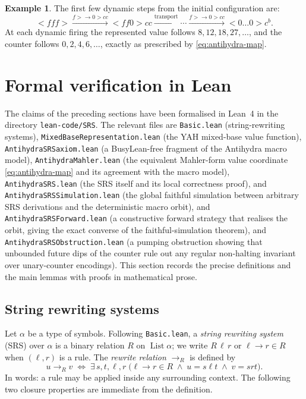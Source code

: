 \documentclass[11pt,a4paper]{article}
\theoremstyle{definition}
\newtheorem{example}[definition]{Example}
\newcommand{\lt}{<}
\newcommand{\gt}{>}
\newcommand{\List}{\operatorname{List}}
\begin{document}
\begin{example}
  The first few dynamic steps from the initial configuration are:
  \[
    \lt fff\gt
    \xrightarrow{f\gt\to0\gt cc}
    \lt ff0\gt cc
    \xrightarrow{\text{transport}}
    \cdots
    \xrightarrow{f\gt\to0\gt cc}
    \lt 0\dots0\gt c^{b}.
  \]
  At each dynamic firing the represented value follows
  $8,12,18,27,\dots$, and the counter follows $0,2,4,6,\dots$,
  exactly as prescribed by \eqref{eq:antihydra-map}.
\end{example}

\section{Formal verification in Lean}
\label{sec:lean}

\begin{sloppypar}
The claims of the preceding sections have been formalised in Lean~4 in
the directory \texttt{lean-code/SRS}.  The relevant files are
\texttt{Basic.lean} (string-rewriting systems),
\texttt{MixedBaseRepresentation.lean} (the YAH mixed-base value
function), \texttt{AntihydraSRSaxiom.lean} (a BusyLean-free fragment of
the Antihydra macro model), \texttt{AntihydraMahler.lean} (the equivalent
Mahler-form value coordinate \eqref{eq:antihydra-map} and its agreement
with the macro model), \texttt{AntihydraSRS.lean} (the SRS itself
and its local correctness proof), and
\texttt{AntihydraSRSSimulation.lean} (the global faithful simulation
between arbitrary SRS derivations and the deterministic macro orbit), and
\texttt{AntihydraSRSForward.lean} (a constructive forward strategy that
realises the orbit, giving the exact converse of the faithful-simulation
theorem), and
\texttt{AntihydraSRSObstruction.lean} (a pumping obstruction showing that
unbounded future dips of the counter rule out any regular non-halting
invariant over unary-counter encodings).
This section records the precise definitions and the main lemmas with
proofs in mathematical prose.
\end{sloppypar}

\subsection{String rewriting systems}

Let $\alpha$ be a type of symbols.  Following \texttt{Basic.lean}, a
\emph{string rewriting system} (SRS) over $\alpha$ is a binary relation
$R$ on $\List\alpha$; we write $R\,\ell\,r$ or $\ell\to r\in R$ when
$(\ell,r)$ is a rule.  The \emph{rewrite relation} $\to_R$ is defined
by
\begin{equation}
  \label{eq:rewrite-step}
  u\to_R v
  \;\iff\;
  \exists\,s,t,\ell,r\;\bigl(\ell\to r\in R\;\wedge\;u=s\ell t\;\wedge\;v=srt\bigr).
\end{equation}
In words: a rule may be applied inside any surrounding context.  The
following two closure properties are immediate from the definition.
\end{document}

